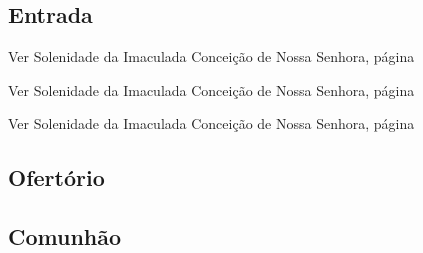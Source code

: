 
\subsection{Entrada}\label{subsection:proprium-sanctorum/in-annuntiatione-domini/introitus}


\begin{rubrica}
  Ver Solenidade da Imaculada Conceição de Nossa Senhora, página~\pageref{subsection:proprium-sanctorum/in-conceptione-immaculata-bmv/psalmus-responsorius}
\end{rubrica}


\begin{rubrica}
  Ver Solenidade da Imaculada Conceição de Nossa Senhora, página~\pageref{subsection:proprium-sanctorum/in-conceptione-immaculata-bmv/alleluia}
\end{rubrica}


\begin{rubrica}
  Ver Solenidade da Imaculada Conceição de Nossa Senhora, página~\pageref{subsection:proprium-sanctorum/in-conceptione-immaculata-bmv/psalmus-alleluiaticus}
\end{rubrica}

\AllowPageFlush

\subsection{Ofertório}\label{subsection:proprium-sanctorum/in-annuntiatione-domini/offertorium}

\subsection{Comunhão}\label{subsection:proprium-sanctorum/in-annuntiatione-domini/communio}
